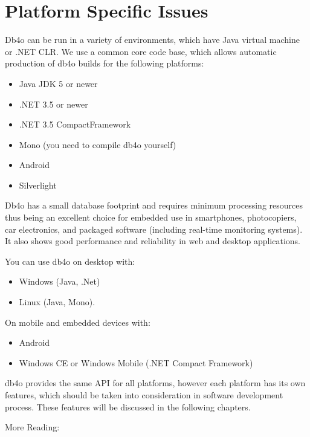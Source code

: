 
\chapter{Platform Specific Issues}
\label{ref:platform-specific-issues}

Db4o can be run in a variety of environments, which have Java virtual machine or .NET CLR. We use a common core code base, which allows automatic production of db4o builds for the following platforms:

\begin{itemize}
\item Java JDK 5 or newer
\item .NET 3.5 or newer
\item .NET 3.5 CompactFramework
\item Mono (you need to compile db4o yourself)
\item Android
\item Silverlight
\end{itemize}

Db4o has a small database footprint and requires minimum processing resources thus being an excellent choice for embedded use in smartphones, photocopiers, car electronics, and packaged software (including real-time monitoring systems). It also shows good performance and reliability in web and desktop applications.

You can use db4o on desktop with:

\begin{itemize}
\item Windows (Java, .Net)
\item Linux (Java, Mono).
\end{itemize}

On mobile and embedded devices with:

\begin{itemize}
\item Android
\item Windows CE or Windows Mobile (.NET Compact Framework)
\end{itemize}

db4o provides the same API for all platforms, however each platform has its own features, which should be taken into consideration in software development process. These features will be discussed in the following chapters.

More Reading:

